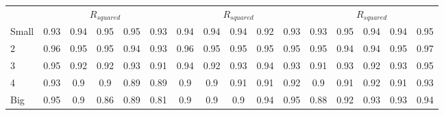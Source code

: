 \begin{table}[H]
\begin{tabular}{lccccc|ccccc|ccccc}
 & \multicolumn{5}{c|}{$R_{squared}$} & \multicolumn{5}{c|}{$R_{squared}$} & \multicolumn{5}{c}{$R_{squared}$} \\
Small & 0.93 & 0.94 & 0.95 & 0.95 & 0.93 & 0.94 & 0.94 & 0.94 & 0.92 & 0.93 & 0.93 & 0.95 & 0.94 & 0.94 & 0.95 \\
2 & 0.96 & 0.95 & 0.95 & 0.94 & 0.93 & 0.96 & 0.95 & 0.95 & 0.95 & 0.95 & 0.95 & 0.94 & 0.94 & 0.95 & 0.97 \\
3 & 0.95 & 0.92 & 0.92 & 0.93 & 0.91 & 0.94 & 0.92 & 0.93 & 0.94 & 0.93 & 0.91 & 0.93 & 0.92 & 0.93 & 0.95 \\
4 & 0.93 & 0.9 & 0.9 & 0.89 & 0.89 & 0.9 & 0.9 & 0.91 & 0.91 & 0.92 & 0.9 & 0.91 & 0.92 & 0.91 & 0.93 \\
Big & 0.95 & 0.9 & 0.86 & 0.89 & 0.81 & 0.9 & 0.9 & 0.9 & 0.94 & 0.95 & 0.88 & 0.92 & 0.93 & 0.93 & 0.94 \\
\end{tabular}
\end{table}
